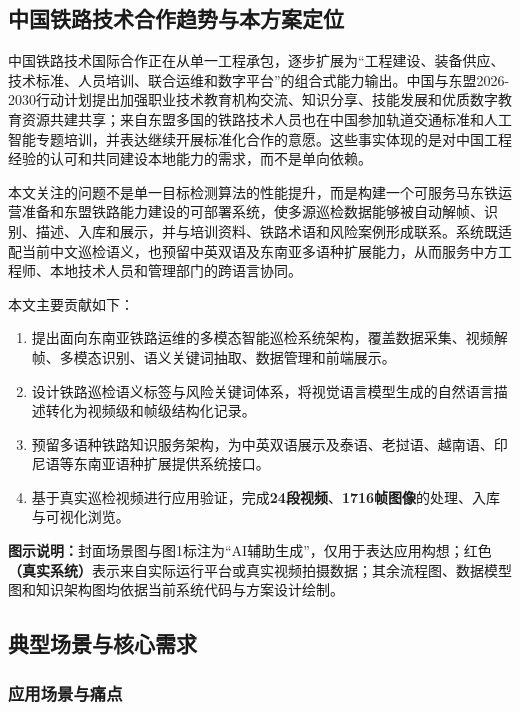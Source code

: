 \documentclass[UTF8,a4paper,zihao=-4]{ctexart}
\newcommand{\keynum}[1]{\textcolor{railred}{\bfseries #1}}
\newcommand{\realmark}{\textcolor{railred}{\bfseries （真实系统）}}
\begin{document}
\subsection{中国铁路技术合作趋势与本方案定位}

中国铁路技术国际合作正在从单一工程承包，逐步扩展为“工程建设、装备供应、技术标准、人员培训、联合运维和数字平台”的组合式能力输出。中国与东盟2026-2030行动计划提出加强职业技术教育机构交流、知识分享、技能发展和优质数字教育资源共建共享\cite{asean-china-action-plan}；来自东盟多国的铁路技术人员也在中国参加轨道交通标准和人工智能专题培训，并表达继续开展标准化合作的意愿\cite{asean-rail-training}。这些事实体现的是对中国工程经验的认可和共同建设本地能力的需求，而不是单向依赖。

本文关注的问题不是单一目标检测算法的性能提升，而是构建一个可服务马东铁运营准备和东盟铁路能力建设的可部署系统，使多源巡检数据能够被自动解帧、识别、描述、入库和展示，并与培训资料、铁路术语和风险案例形成联系。系统既适配当前中文巡检语义，也预留中英双语及东南亚多语种扩展能力，从而服务中方工程师、本地技术人员和管理部门的跨语言协同。

本文主要贡献如下：
\begin{enumerate}
  \item 提出面向东南亚铁路运维的多模态智能巡检系统架构，覆盖数据采集、视频解帧、多模态识别、语义关键词抽取、数据管理和前端展示。
  \item 设计铁路巡检语义标签与风险关键词体系，将视觉语言模型生成的自然语言描述转化为视频级和帧级结构化记录。
  \item 预留多语种铁路知识服务架构，为中英双语展示及泰语、老挝语、越南语、印尼语等东南亚语种扩展提供系统接口。
  \item 基于真实巡检视频进行应用验证，完成\keynum{24段视频}、\keynum{1716帧图像}的处理、入库与可视化浏览。
\end{enumerate}

\noindent\textbf{图示说明：}封面场景图与图1标注为“AI辅助生成”，仅用于表达应用构想；红色\realmark 表示来自实际运行平台或真实视频拍摄数据；其余流程图、数据模型图和知识架构图均依据当前系统代码与方案设计绘制。

\subsection{典型场景与核心需求}

\subsubsection{应用场景与痛点}
\end{document}
